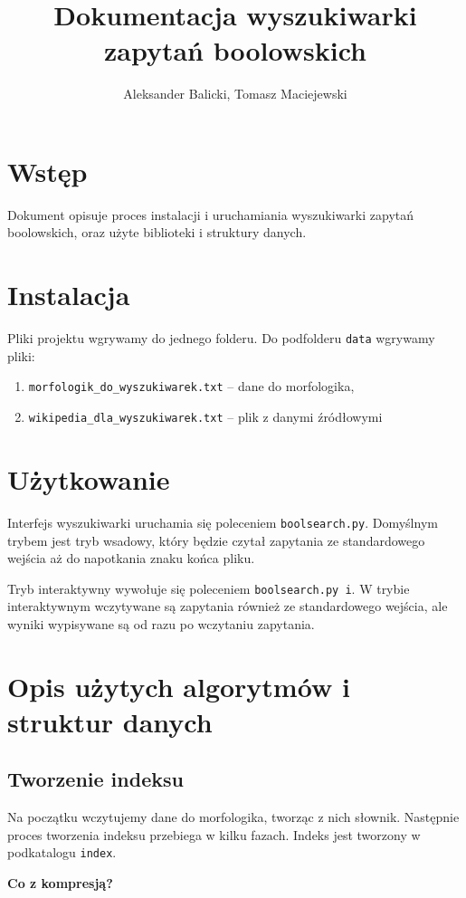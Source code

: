 \documentclass[11pt]{article}
\author{Aleksander Balicki, Tomasz Maciejewski}
\title{Dokumentacja wyszukiwarki zapytań boolowskich}
\begin{document}
\maketitle

\section{Wstęp}
Dokument opisuje proces instalacji i uruchamiania wyszukiwarki zapytań boolowskich, oraz użyte biblioteki i struktury danych.

\section{Instalacja}
Pliki projektu wgrywamy do jednego folderu. Do podfolderu \texttt{data} wgrywamy pliki:
\begin{enumerate}
\item \texttt{morfologik\_do\_wyszukiwarek.txt} -- dane do morfologika,
\item \texttt{wikipedia\_dla\_wyszukiwarek.txt} -- plik z danymi źródłowymi
\end{enumerate}

\section{Użytkowanie}
Interfejs wyszukiwarki uruchamia się poleceniem \texttt{boolsearch.py}. Domyślnym trybem jest tryb wsadowy, który będzie czytał zapytania ze standardowego wejścia aż do napotkania znaku końca pliku.

Tryb interaktywny wywołuje się poleceniem \texttt{boolsearch.py i}. W trybie interaktywnym wczytywane są zapytania również ze standardowego wejścia, ale wyniki wypisywane są od razu po wczytaniu zapytania.

\section{Opis użytych algorytmów i struktur danych}

\subsection{Tworzenie indeksu}
Na początku wczytujemy dane do morfologika, tworząc z nich słownik. Następnie proces tworzenia indeksu przebiega w kilku fazach. Indeks jest tworzony w podkatalogu \texttt{index}.

\textbf{Co z kompresją?}
\end{document}

